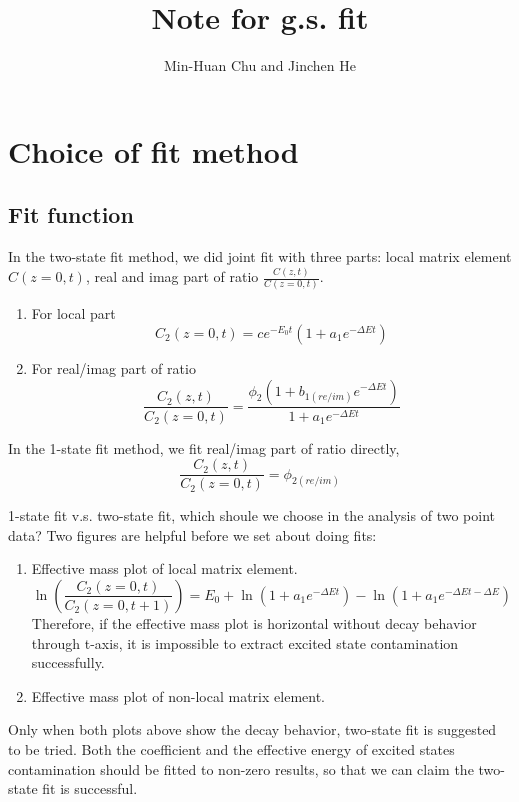 \documentclass{article}
\title{Note for g.s. fit}
\author{Min-Huan Chu and Jinchen He}
\date{}
\begin{document}
\maketitle
\section{Choice of fit method}

\subsection{Fit function}
In the two-state fit method, we did joint fit with three parts: local matrix element $C(z=0, t)$, real and imag part of ratio $\frac{C(z, t)}{C(z=0, t)}$. 
\begin{enumerate}
    \item For local part
    \[ C_2(z=0, t) = c e^{-E_{0} t}\left(1+a_{1} e^{-\Delta E t}\right) \]
    \item For real/imag part of ratio
    \[ \frac{C_2(z, t)}{C_2(z=0, t)} = \frac{\phi_{2}\left(1+b_{1 (re/im)} e^{-\Delta E t}\right)}{1+a_{1} e^{-\Delta E t}} \]
\end{enumerate}

In the 1-state fit method, we fit real/imag part of ratio directly,
\[ \frac{C_2(z, t)}{C_2(z=0, t)} = \phi_{2 (re/im)} \]

1-state fit v.s. two-state fit, which shoule we choose in the analysis of two point data? Two figures are helpful before we set about doing fits:

\begin{enumerate}
    \item Effective mass plot of local matrix element.
    \[ \ln(\frac{C_2(z=0, t)}{C_2(z=0, t+1)}) = E_0 + \ln(1 + a_1 e^{-\Delta E t}) - \ln(1 + a_1 e^{-\Delta E t - \Delta E}) \]
    Therefore, if the effective mass plot is horizontal without decay behavior through t-axis, it is impossible to extract excited state contamination successfully.
    \item Effective mass plot of non-local matrix element.
    
\end{enumerate}

Only when both plots above show the decay behavior, two-state fit is suggested to be tried. Both the coefficient and the effective energy of excited states contamination should be fitted to non-zero results, so that we can claim the two-state fit is successful.
\end{document}
